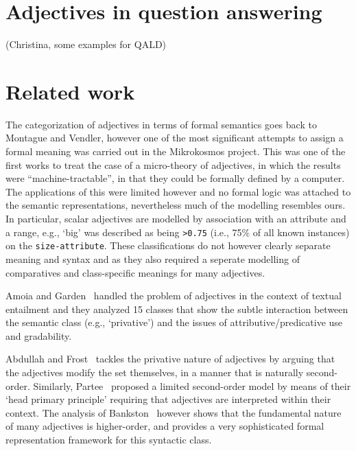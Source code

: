 \documentclass[11pt]{article}
\begin{document}
\section{Adjectives in question answering}

(Christina, some examples for QALD)

\section{Related work}

The categorization of adjectives in terms of formal semantics goes back to Montague and Vendler, however one of the most significant attempts to assign a formal meaning was carried out in the Mikrokosmos project\cite{raskin1995lexical}. This was one of the first works to treat the case of a micro-theory of adjectives, in which the results were ``machine-tractable'', in that they could be formally defined by a computer. The applications of this were limited however and no formal logic was attached to the semantic representations, nevertheless much of the modelling resembles ours. In particular, scalar adjectives are modelled by association with an attribute and a range, e.g., `big' was described as being {\tt >0.75} (i.e., 75\% of all known instances) on the {\tt size-attribute}. These classifications do not however clearly separate meaning and syntax and as they also required a seperate modelling of comparatives and class-specific meanings for many adjectives.

Amoia and Garden~ handled the problem of adjectives in the context of textual entailment and they analyzed 15 classes that show the subtle interaction between the semantic class (e.g., `privative') and the issues of attributive/predicative use and gradability. 

Abdullah and Frost~ tackles the privative nature of adjectives by arguing that the adjectives modify the set themselves, in a manner that is naturally second-order. Similarly, Partee~ proposed a limited second-order model by means of their `head primary principle' requiring that adjectives are interpreted within their context. The analysis of Bankston~ however shows that the fundamental nature of many adjectives is higher-order, and provides a very sophisticated formal representation framework for this syntactic class.
\end{document}
